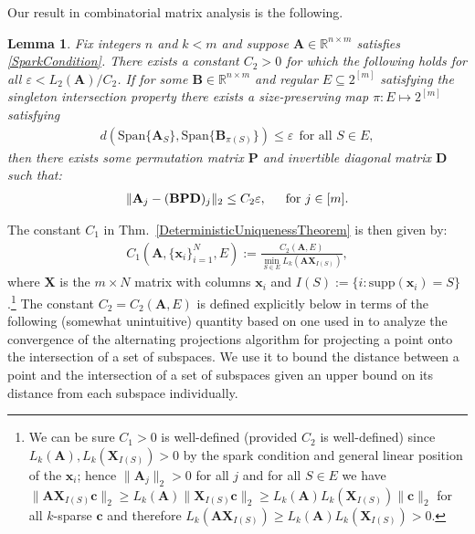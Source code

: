 \documentclass[9pt,twocolumn]{pnas-new}
\newtheorem{lemma}{Lemma}
\begin{document}

Our result in combinatorial matrix analysis is the following.

\begin{lemma}\label{MainLemma}
Fix integers $n$ and $k < m$ and suppose $\mathbf{A} \in \mathbb{R}^{n \times m}$ satisfies \eqref{SparkCondition}. There exists a constant $C_2 > 0$ for which the following holds for all $\varepsilon < L_2(\mathbf{A}) / C_2$. If for some  $\mathbf{B} \in \mathbb{R}^{n \times m}$ and regular $E \subseteq2^{[m]}$ satisfying the singleton intersection property there exists a size-preserving map $\pi: E \mapsto 2^{[m]}$ satisfying
\begin{align}\label{GapUpperBound}
d(\text{Span}\{\mathbf{A}_{S}\}, \text{Span}\{\mathbf{B}_{\pi(S)}\}) \leq \varepsilon \ \ \text{for all $S \in E$},
\end{align}
%
then there exists some permutation matrix $\mathbf{P}$ and invertible diagonal matrix $\mathbf{D}$ such that:
\begin{align}\label{MainLemmaBPD}
\|\mathbf{A}_j - (\mathbf{BPD})_j\|_2 \leq C_2 \varepsilon, \indent \text{for } j \in [m].
\end{align}
\end{lemma}

The constant $C_1$ in Thm.~\ref{DeterministicUniquenessTheorem} is then given by:
\begin{align}
C_1(\mathbf{A}, \{\mathbf{x}_i\}_{i=1}^N, E) := \frac{ C_2(\mathbf{A}, E) } { \min_{S \in E} L_k(\mathbf{AX}_{I(S)}) },
\end{align}
%
where $\mathbf{X}$ is the $m \times N$ matrix with columns $\mathbf{x}_i$ and $I(S) := \{i : \text{supp}(\mathbf{x}_i) = S\}$.\footnote{We can be sure $C_1 > 0$ is well-defined (provided $C_2$ is well-defined) since $L_k(\mathbf{A}), L_k(\mathbf{X}_{I(S)}) > 0$ by the spark condition and general linear position of the $\mathbf{x}_i$; hence $\|\mathbf{A}_j\|_2 > 0$ for all $j$ and for all $S \in E$ we have $\|\mathbf{AX}_{I(S)}\mathbf{c}\|_2 \geq L_k(\mathbf{A})\|\mathbf{X}_{I(S)}\mathbf{c}\|_2 \geq L_k(\mathbf{A}) L_k(\mathbf{X}_{I(S)})\|\mathbf{c}\|_2$ for all $k$-sparse $\mathbf{c}$ and therefore $L_k(\mathbf{AX}_{I(S)}) \geq L_k(\mathbf{A}) L_k(\mathbf{X}_{I(S)}) > 0$.} The constant $C_2 = C_2(\mathbf{A}, E)$ is defined explicitly below in terms of the following (somewhat unintuitive) quantity based on one used in \cite{Deutsch12} to analyze the convergence of the alternating projections algorithm for projecting a point onto the intersection of a set of subspaces. We use it to bound the distance between a point and the intersection of a set of subspaces given an upper bound on its distance from each subspace individually.
\end{document}
